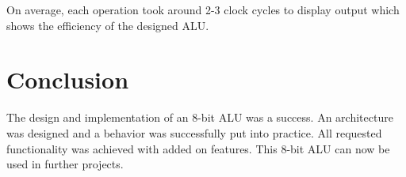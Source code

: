 \documentclass[12pt]{article}
\begin{document}
On average, each operation took around 2-3 clock cycles to display output which shows the efficiency of the designed ALU.
\section{Conclusion}
The design and implementation of an 8-bit ALU was a success. An architecture was designed and a behavior was successfully put into practice. All requested functionality was achieved with added on features. This 8-bit ALU can now be used in further projects.
\end{document}
